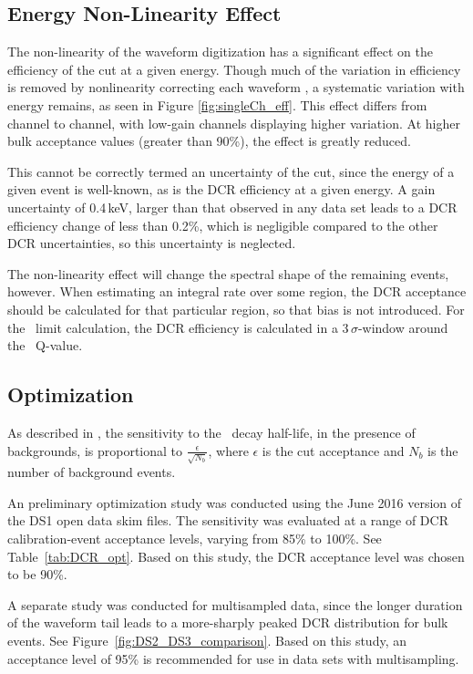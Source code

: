 \documentclass[groupedaddress,rmp,amsmath,amssymb,bibnotes,altaffilletter,twocolumn]{revtex4-1}
\begin{document}
\subsection{Energy Non-Linearity Effect}
The non-linearity of the waveform digitization has a significant effect on the efficiency of the cut at a given energy. Though much of the variation in efficiency is removed by nonlinearity correcting each waveform \cite{EnergyUnidoc}, a systematic variation with energy remains, as seen in Figure \ref{fig:singleCh_eff}. This effect differs from channel to channel, with low-gain channels displaying higher variation. At higher bulk acceptance values (greater than 90\%), the effect is greatly reduced.

This cannot be correctly termed an uncertainty of the cut, since the energy of a given event is well-known, as is the DCR efficiency at a given energy. A gain uncertainty of 0.4\,keV, larger than that observed in any data set \cite{EnergyUnidoc} leads to a DCR efficiency change of less than 0.2\%, which is negligible compared to the other DCR uncertainties, so this uncertainty is neglected. 

The non-linearity effect will change the spectral shape of the remaining events, however. When estimating an integral rate over some region, the DCR acceptance should be calculated for that particular region, so that bias is not introduced. For the \nonubb\ limit calculation, the DCR efficiency is calculated in a 3\,$\sigma$-window around the \nonubb\ Q-value. 

\subsection{Optimization}
As described in \cite{Detwiler_sensitivity}, the sensitivity to the \nonubb\ decay half-life, in the presence of backgrounds, is proportional to $\frac{\epsilon}{\sqrt{N_b}}$, where $\epsilon$ is the cut acceptance and $N_b$ is the number of background events. 

An preliminary optimization study was conducted using the June 2016 version of the DS1 open data skim files. The sensitivity was evaluated at a range of DCR calibration-event acceptance levels, varying from 85\% to 100\%. See Table~\ref{tab:DCR_opt}. Based on this study, the DCR acceptance level was chosen to be 90\%. 

A separate study was conducted for multisampled data, since the longer duration of the waveform tail leads to a more-sharply peaked DCR distribution for bulk events. See Figure~\ref{fig:DS2_DS3_comparison}. Based on this study, an acceptance level of 95\% is recommended for use in data sets with multisampling. 
\end{document}

